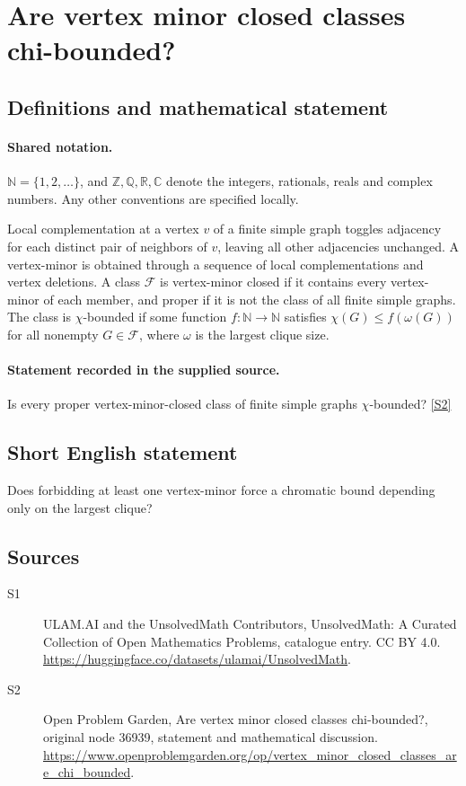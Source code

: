 \documentclass[11pt]{article}
\newcommand{\sref}[2]{\hyperlink{source:#1:#2}{[S#2]}}
\begin{document}
\section{Are vertex minor closed classes chi-bounded?}\label{statement}

\subsection{Definitions and mathematical statement}

\paragraph{Shared notation.}$\mathbb N=\{1,2,\ldots\}$, and $\mathbb Z,\mathbb Q,\mathbb R,\mathbb C$ denote the integers, rationals, reals and complex numbers. Any other conventions are specified locally.


Local complementation at a vertex $v$ of a finite simple graph toggles adjacency for each distinct pair of neighbors of $v$, leaving all other adjacencies unchanged. A vertex-minor is obtained through a sequence of local complementations and vertex deletions. A class $\mathcal F$ is vertex-minor closed if it contains every vertex-minor of each member, and proper if it is not the class of all finite simple graphs. The class is $\chi$-bounded if some function $f:\mathbb N\to\mathbb N$ satisfies $\chi(G)\le f(\omega(G))$ for all nonempty $G\in\mathcal F$, where $\omega$ is the largest clique size.
\paragraph{Statement recorded in the supplied source.}
Is every proper vertex-minor-closed class of finite simple graphs $\chi$-bounded? \sref{statement}{2}
\subsection{Short English statement}
Does forbidding at least one vertex-minor force a chromatic bound depending only on the largest clique?
\subsection{Sources}
\begin{description}
\item[\hypertarget{source:statement:1}{S1}] ULAM.AI and the UnsolvedMath Contributors, UnsolvedMath: A Curated Collection of Open Mathematics Problems, catalogue entry. CC BY 4.0. \url{https://huggingface.co/datasets/ulamai/UnsolvedMath}.
\item[\hypertarget{source:statement:2}{S2}] Open Problem Garden, Are vertex minor closed classes chi-bounded?, original node 36939, statement and mathematical discussion. \url{https://www.openproblemgarden.org/op/vertex_minor_closed_classes_are_chi_bounded}.
\end{description}
\label{end:statement}
\end{document}

